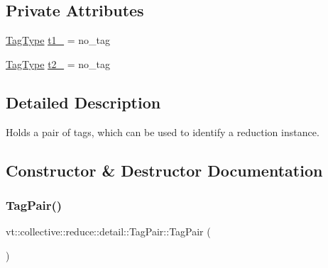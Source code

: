 \subsection*{Private Attributes}
\begin{DoxyCompactItemize}
\item 
\hyperlink{namespacevt_a84ab281dae04a52a4b243d6bf62d0e52}{Tag\+Type} \hyperlink{structvt_1_1collective_1_1reduce_1_1detail_1_1_tag_pair_ac251b77698f3dcdb103e71c7d5dd611c}{t1\+\_\+} = no\+\_\+tag
\item 
\hyperlink{namespacevt_a84ab281dae04a52a4b243d6bf62d0e52}{Tag\+Type} \hyperlink{structvt_1_1collective_1_1reduce_1_1detail_1_1_tag_pair_a7ac7531419c69f430b0a4102399ddb19}{t2\+\_\+} = no\+\_\+tag
\end{DoxyCompactItemize}


\subsection{Detailed Description}
Holds a pair of tags, which can be used to identify a reduction instance. 

\subsection{Constructor \& Destructor Documentation}
\mbox{\label{structvt_1_1collective_1_1reduce_1_1detail_1_1_tag_pair_a91e1f46e160d495cd07384408526656b}} 
\subsubsection{\texorpdfstring{Tag\+Pair()}{TagPair()}\hspace{0.1cm}{\footnotesize\ttfamily [1/2]}}
{\footnotesize\ttfamily vt\+::collective\+::reduce\+::detail\+::\+Tag\+Pair\+::\+Tag\+Pair (\begin{DoxyParamCaption}{ }\end{DoxyParamCaption})\hspace{0.3cm}{\ttfamily [default]}}

\mbox{\label{structvt_1_1collective_1_1reduce_1_1detail_1_1_tag_pair_aaab6b3334a06019160dd6451575b03aa}} 
